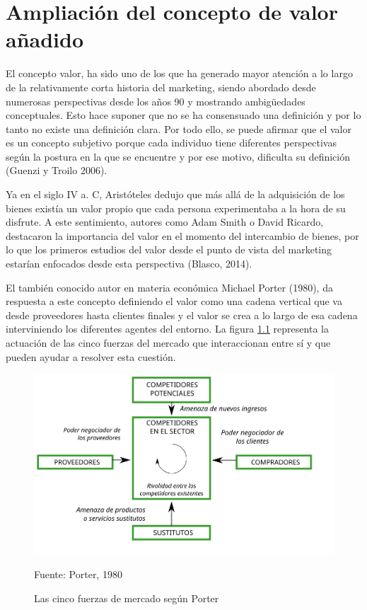 \chapter{Ampliación del concepto de valor añadido}
\label{anexo:1}

El concepto valor, ha sido uno de los que ha generado mayor atención a lo largo de la relativamente corta historia del marketing, siendo abordado desde numerosas perspectivas desde los años 90 y mostrando ambigüedades conceptuales. Esto hace suponer que no se ha consensuado una definición y por lo tanto no existe una definición clara. Por todo ello, se puede afirmar que el valor es un concepto subjetivo porque cada individuo tiene diferentes perspectivas según la postura en la que se encuentre y por ese motivo, dificulta su definición (Guenzi y Troilo 2006).

Ya en el siglo IV a. C, Aristóteles dedujo que más allá de la adquisición de los bienes existía un valor propio que cada persona experimentaba a la hora de su disfrute. A este sentimiento, autores como Adam Smith o David Ricardo, destacaron la importancia del valor en el momento del intercambio de bienes, por lo que los primeros estudios del valor desde el punto de vista del marketing estarían enfocados desde esta perspectiva (Blasco, 2014).

El también conocido autor en materia económica Michael Porter (1980), da respuesta a este concepto definiendo el valor como una cadena vertical que va desde proveedores hasta clientes finales y el valor se crea a lo largo de esa cadena interviniendo los diferentes agentes del entorno. La figura \ref{fig:cincoFuerzasPorter} representa la actuación de las cinco fuerzas del mercado que interaccionan entre sí y que pueden ayudar a resolver esta cuestión.

\begin{figure}[!h]
	\caption{Las cinco fuerzas de mercado según Porter}
	\centering \includegraphics[width=130mm]{capitulos/graficos/cincoFuerzasPorter}
	\label{fig:cincoFuerzasPorter}

		\footnotesize
		Fuente: Porter, 1980
\end{figure}

